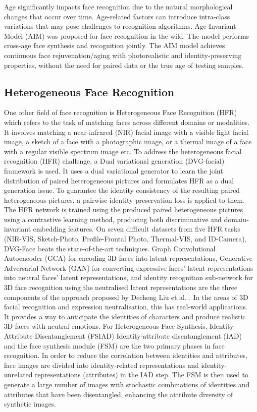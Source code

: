 Age significantly impacts face recognition due to the natural morphological changes that occur over time. Age-related factors can introduce intra-class variations that may pose challenges to recognition algorithms. Age-Invariant Model (AIM) \cite{zhao_towards_2022} was proposed for face recognition in the wild. The model performs cross-age face synthesis and recognition jointly. The AIM model achieves continuous face rejuvenation/aging with photorealistic and identity-preserving properties, without the need for paired data or the true age of testing samples.

\subsection{Heterogeneous Face Recognition}

One other field of face recognition is Heterogeneous Face Recognition (HFR) which refers to the task of matching faces across different domains or modalities. It involves matching a near-infrared (NIR) facial image with a visible light facial image, a sketch of a face with a photographic image, or a thermal image of a face with a regular visible spectrum image etc. To address the heterogeneous facial recognition (HFR) challenge, a Dual variational generation (DVG-facial) \cite{fu_dvg-face_2022} framework is used. It uses a dual variational generator to learn the joint distribution of paired heterogeneous pictures and formulates HFR as a dual generation issue. To guarantee the identity consistency of the resulting paired heterogeneous pictures, a pairwise identity preservation loss is applied to them. The HFR network is trained using the produced paired heterogeneous pictures using a contrastive learning method, producing both discriminative and domain-invariant embedding features. On seven difficult datasets from five HFR tasks (NIR-VIS, Sketch-Photo, Profile-Frontal Photo, Thermal-VIS, and ID-Camera), DVG-Face beats the state-of-the-art techniques.
Graph Convolutional Autoencoder (GCA) for encoding 3D faces into latent representations, Generative Adversarial Network (GAN) for converting expressive faces' latent representations into neutral faces' latent representations, and identity recognition sub-network for 3D face recognition using the neutralised latent representations are the three components of the approach proposed by Decheng Liu et al. \cite{liu_heterogeneous_2022}. In the areas of 3D facial recognition and expression neutralisation, this has real-world applications. It provides a way to anticipate the identities of characters and produce realistic 3D faces with neutral emotions.
For Heterogeneous Face Synthesis, Identity-Attribute Disentanglement (FSIAD) \cite{yang_heterogeneous_2022} Identity-attribute disentanglement (IAD) and the face synthesis module (FSM) are the two primary phases in face recognition. In order to reduce the correlation between identities and attributes, face images are divided into identity-related representations and identity-unrelated representations (attributes) in the IAD step. The FSM is then used to generate a large number of images with stochastic combinations of identities and attributes that have been disentangled, enhancing the attribute diversity of synthetic images.
